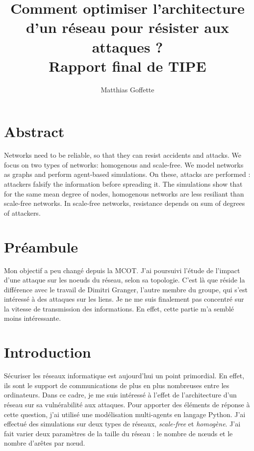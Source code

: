 \documentclass[12pt,a4paper]{article}
\title{Comment optimiser l'architecture d'un réseau pour résister aux attaques ?\\
  Rapport final de TIPE}
\author{Matthias Goffette}
\begin{document}
\maketitle

\section*{Abstract} %

Networks need to be reliable, so that they can resist accidents and attacks.
We focus on two types of networks: homogenous and scale-free.
We model networks as graphs and perform agent-based simulations.
On these, attacks are performed : attackers falsify the information before spreading it.
The simulations show that for the same mean degree of nodes, homogenous networks are less resiliant than scale-free networks.
In scale-free networks, resistance depends on sum of degrees of attackers.



\section{Préambule} %

Mon objectif a peu changé depuis la MCOT.
J'ai poursuivi l'étude de l'impact d'une attaque sur les noeuds du réseau, selon sa topologie.
C'est là que réside la différence avec le travail de Dimitri Granger, l'autre membre du groupe, qui s'est intéressé à des attaques sur les liens.
Je ne me suis finalement pas concentré sur la vitesse de transmission des informations.
En effet, cette partie m'a semblé moins intéressante.


\section{Introduction} %


Sécuriser les réseaux informatique est aujourd'hui un point primordial.
En effet, ils sont le support de communications de plus en plus nombreuses entre les ordinateurs.
Dans ce cadre, je me suis intéressé à l'effet de l'architecture d'un réseau sur sa vulnérabilité aux attaques.
Pour apporter des éléments de réponse à cette question, j'ai utilisé une modélisation multi-agents en langage Python.
J'ai effectué des simulations sur deux types de réseaux, \emph{scale-free} et \emph{homogène}.
J'ai fait varier deux paramètres de la taille du réseau : le nombre de nœuds et le nombre d'arêtes par nœud.  
\end{document}
